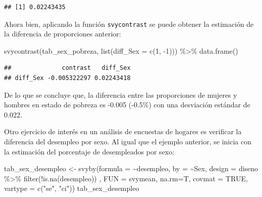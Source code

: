\documentclass[
  12pt,
]{book}
\newenvironment{Shaded}{\begin{snugshade}}{\end{snugshade}}
\newcommand{\AttributeTok}[1]{\textcolor[rgb]{0.77,0.63,0.00}{#1}}
\newcommand{\ConstantTok}[1]{\textcolor[rgb]{0.00,0.00,0.00}{#1}}
\newcommand{\DecValTok}[1]{\textcolor[rgb]{0.00,0.00,0.81}{#1}}
\newcommand{\FunctionTok}[1]{\textcolor[rgb]{0.00,0.00,0.00}{#1}}
\newcommand{\NormalTok}[1]{#1}
\newcommand{\OtherTok}[1]{\textcolor[rgb]{0.56,0.35,0.01}{#1}}
\newcommand{\SpecialCharTok}[1]{\textcolor[rgb]{0.00,0.00,0.00}{#1}}
\newcommand{\StringTok}[1]{\textcolor[rgb]{0.31,0.60,0.02}{#1}}
\begin{document}
\begin{verbatim}
## [1] 0.02243435
\end{verbatim}

Ahora bien, aplicando la función \texttt{svycontrast} se puede obtener la estimación de la diferencia de proporciones anterior:

\begin{Shaded}
\begin{Highlighting}[]
\FunctionTok{svycontrast}\NormalTok{(tab\_sex\_pobreza,}
            \FunctionTok{list}\NormalTok{(}\AttributeTok{diff\_Sex =} \FunctionTok{c}\NormalTok{(}\DecValTok{1}\NormalTok{, }\SpecialCharTok{{-}}\DecValTok{1}\NormalTok{))) }\SpecialCharTok{\%\textgreater{}\%}
  \FunctionTok{data.frame}\NormalTok{()}
\end{Highlighting}
\end{Shaded}

\begin{verbatim}
##              contrast   diff_Sex
## diff_Sex -0.005322297 0.02243418
\end{verbatim}

De lo que se concluye que, la diferencia entre las proporciones de mujeres y hombres en estado de pobreza es -0.005 (-0.5\%) con una desviación estándar de 0.022.

Otro ejercicio de interés en un análisis de encuestas de hogares es verificar la diferencia del desempleo por sexo. Al igual que el ejemplo anterior, se inicia con la estimación del porcentaje de desempleados por sexo:

\begin{Shaded}
\begin{Highlighting}[]
\NormalTok{tab\_sex\_desempleo }\OtherTok{\textless{}{-}} \FunctionTok{svyby}\NormalTok{(}\AttributeTok{formula =} \SpecialCharTok{\textasciitilde{}}\NormalTok{desempleo, }\AttributeTok{by =} \SpecialCharTok{\textasciitilde{}}\NormalTok{Sex, }
                           \AttributeTok{design  =}\NormalTok{ diseno }\SpecialCharTok{\%\textgreater{}\%} \FunctionTok{filter}\NormalTok{(}\SpecialCharTok{!}\FunctionTok{is.na}\NormalTok{(desempleo)) , }
                           \AttributeTok{FUN     =}\NormalTok{ svymean, }\AttributeTok{na.rm=}\NormalTok{T, }\AttributeTok{covmat =} \ConstantTok{TRUE}\NormalTok{,}
                           \AttributeTok{vartype =} \FunctionTok{c}\NormalTok{(}\StringTok{"se"}\NormalTok{, }\StringTok{"ci"}\NormalTok{))}
\NormalTok{tab\_sex\_desempleo}
\end{Highlighting}
\end{Shaded}
\end{document}
